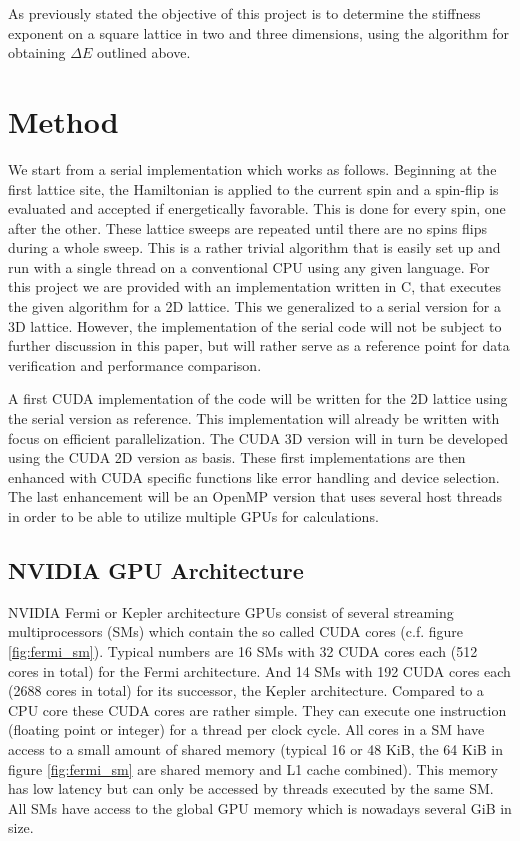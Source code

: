 \documentclass[paper=a4, fontsize=11pt]{scrartcl} %
\numberwithin{equation}{section} %
\numberwithin{figure}{section} %
\numberwithin{table}{section} %
\begin{document}
As previously stated the objective of this project is to determine the stiffness exponent on a square lattice in two and three dimensions, using the algorithm for obtaining $\Delta E$ outlined above.

\section{Method}
\label{sec:method}
We start from a serial implementation which works as follows. Beginning at the first lattice site, the Hamiltonian is applied to the current spin and a spin-flip is evaluated and accepted if energetically favorable. This is done for every spin, one after the other. These lattice sweeps are repeated until there are no spins flips during a whole sweep. This is a rather trivial algorithm that is easily set up and run with a single thread on a conventional CPU using any given language. For this project we are provided with an implementation written in C, that executes the given algorithm for a 2D lattice. This we generalized to a serial version for a 3D lattice. However, the implementation of the serial code will not be subject to further discussion in this paper, but will rather serve as a reference point for data verification and performance comparison.

A first CUDA implementation of the code will be written for the 2D lattice using the serial version as reference. This implementation will already be written with focus on efficient parallelization. The CUDA 3D version will in turn be developed using the CUDA 2D version as basis. These first implementations are then enhanced with CUDA specific functions like error handling and device selection. The last enhancement will be an OpenMP version that uses several host threads in order to be able to utilize multiple GPUs for calculations.

\subsection{NVIDIA GPU Architecture}
NVIDIA Fermi or Kepler architecture GPUs consist of several streaming multiprocessors (SMs) which contain the so called CUDA cores (c.f. figure \ref{fig:fermi_sm}). Typical numbers are 16 SMs with 32 CUDA cores each (512 cores in total) for the Fermi architecture. And 14 SMs with 192 CUDA cores each (2688 cores in total) for its successor, the Kepler architecture. Compared to a CPU core these CUDA cores are rather simple. They can execute one instruction (floating point or integer) for a thread per clock cycle. All cores in a SM have access to a small amount of shared memory (typical 16 or 48 KiB, the 64 KiB in figure \ref{fig:fermi_sm} are shared memory and L1 cache combined). This memory has low latency but can only be accessed by threads executed by the same SM. All SMs have access to the global GPU memory which is nowadays several GiB in size.
\end{document}
